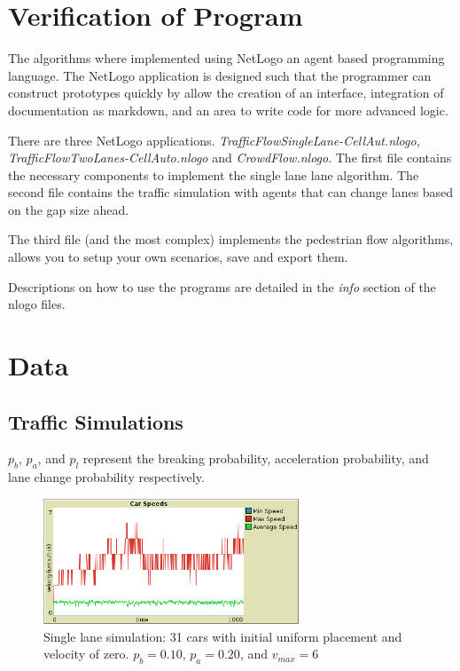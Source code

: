 \documentclass{article}%
\begin{document}
    \section{Verification of Program}      
    The algorithms where implemented using NetLogo an agent based programming language. The NetLogo application is designed such that the programmer can construct prototypes quickly by allow the creation of an interface, integration of documentation as markdown, and an area to write code for more advanced logic.

    There are three NetLogo applications. {\it TrafficFlowSingleLane-CellAut.nlogo, TrafficFlowTwoLanes-CellAuto.nlogo} and {\it CrowdFlow.nlogo}. The first file contains the necessary components to implement the single lane lane algorithm. The second file contains the traffic simulation with agents that can change lanes based on the gap size ahead. 
    
    The third file (and the most complex) implements the pedestrian flow algorithms, allows you to setup your own scenarios, save and export them. 

    Descriptions on how to use the programs are detailed in the {\it info} section of the nlogo files. 


    \section{Data}
    \subsection{ Traffic Simulations }
    $p_b$, $p_a$, and $p_l$ represent the breaking probability, acceleration probability, and lane change probability respectively.
    
    \begin{figure}[ht!]
        \centering
        \includegraphics[width=3in]{../img/VelocitiesSingleLane.png}
        \caption{Single lane simulation: 31 cars with initial uniform placement and velocity of zero. $p_b = 0.10$, $p_a = 0.20$, and $v_{max} = 6$}
        \label{vsl:31:0d1:0d2}
    \end{figure}
    
\end{document}
